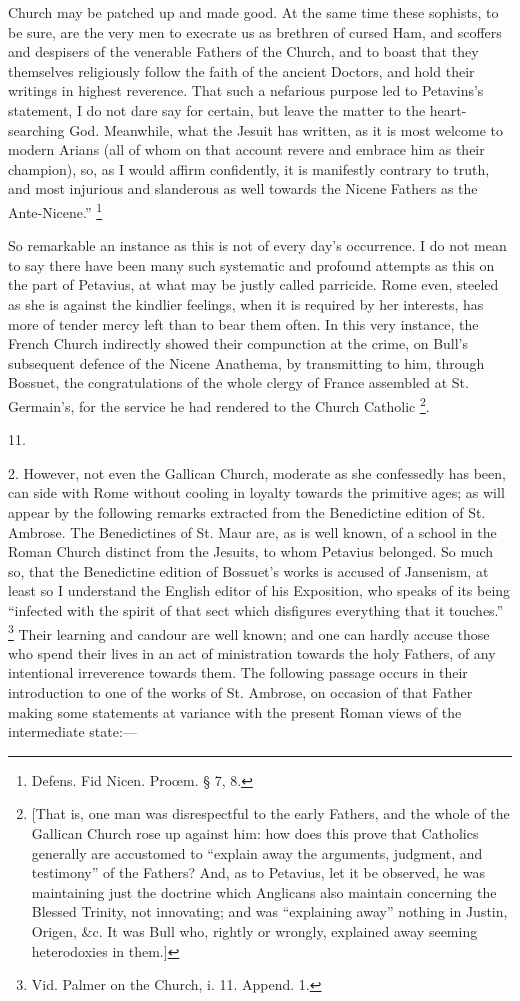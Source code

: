 Church may be patched up and made good. At the same time these
sophists, to be sure, are the very men to execrate us as brethren of
cursed Ham, and scoffers and despisers of the venerable Fathers of the
Church, and to boast that they themselves religiously follow the faith
of the ancient Doctors, and hold their writings in highest reverence.
That such a nefarious purpose led to Petavins's statement, I do
not dare say for certain, but leave the matter to the heart-searching
God. Meanwhile, what the Jesuit has written, as it is most welcome to
modern Arians (all of whom on that account revere and embrace him as
their champion), so, as I would affirm confidently, it is manifestly
contrary to truth, and most injurious and slanderous as well towards
the Nicene Fathers as the Ante-Nicene.'' \footnote{Defens. Fid Nicen. Proœm. § 7, 8.}

So remarkable an instance as this is not of every day's occurrence.
I do not mean to say there have been many such systematic and profound
attempts as this on the part of Petavius, at what may be justly called
parricide. Rome even, steeled as she is against the kindlier feelings,
when it is required by her interests, has more of tender mercy left
than to bear them often. In this very instance, the French Church
indirectly showed their compunction at the crime, on Bull's subsequent
defence of the Nicene Anathema, by transmitting to him, through
Bossuet, the congratulations of the whole clergy of France assembled
at St. Germain's, for the service he had rendered to the Church
Catholic \footnote{[That is, one man was disrespectful to the
early Fathers, and the whole of the Gallican Church rose up against
him: how does this prove that Catholics generally are accustomed to
``explain away the arguments, judgment, and testimony'' of the
Fathers? And, as to Petavius, let it be observed, he was maintaining
just the doctrine which Anglicans also maintain concerning the Blessed
Trinity, not innovating; and was ``explaining away'' nothing
in Justin, Origen, \&c. It was Bull who, rightly or wrongly,
explained away seeming heterodoxies in them.]}.

11.

2. However, not even the Gallican Church, moderate as she
confessedly has been, can side with Rome without cooling in loyalty
towards the primitive ages; as will appear by the following remarks
extracted from the Benedictine edition of St. Ambrose. The
Benedictines of St. Maur are, as is well known, of a school in the
Roman Church distinct from the Jesuits, to whom Petavius
belonged. So much so, that the Benedictine edition of Bossuet's works
is accused of Jansenism, at least so I understand the English editor
of his Exposition, who speaks of its being ``infected with the
spirit of that sect which disfigures everything that it touches.''
\footnote{Vid. Palmer on the Church, i. 11. Append.
1.} Their learning and
candour are well known; and one can hardly accuse those who spend
their lives in an act of ministration towards the holy Fathers, of any
intentional irreverence towards them. The following passage occurs in
their introduction to one of the works of St. Ambrose, on occasion of
that Father making some statements at variance with the present Roman
views of the intermediate state:—

